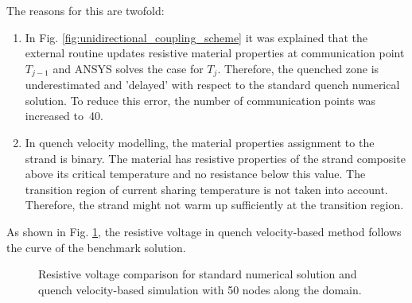 The reasons for this are twofold:
\begin{enumerate}
    \item In Fig. \ref{fig:unidirectional_coupling_scheme} it was explained that the external routine updates resistive material properties at communication point $T_{j-1}$ and ANSYS solves the case for $T_{j}$. Therefore, the quenched zone is underestimated and 'delayed' with respect to the standard quench numerical solution. To reduce this error, the number of communication points was increased to~40. 
    \item In quench velocity modelling, the material properties assignment to the strand is binary. The material has resistive properties of the strand composite above its critical temperature and no resistance below this value. The transition region of current sharing temperature is not taken into account. Therefore, the strand might not warm up sufficiently at the transition region.
\end{enumerate}

As shown in Fig. \ref{fig: q_vel_modelling_res_volt_benchmarking}, the resistive voltage in quench velocity-based method follows the curve of the benchmark solution. 

\begin{figure}[H]
\centering
    \caption{Resistive voltage comparison for standard numerical solution and quench velocity-based simulation with 50 nodes along the domain.}
    \label{fig: q_vel_modelling_res_volt_benchmarking}
\end{figure}

